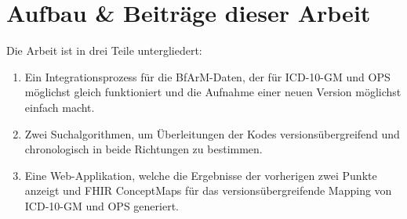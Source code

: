 \section{Aufbau \& Beiträge dieser Arbeit}

Die Arbeit ist in drei Teile untergliedert:

\begin{enumerate}
\item Ein Integrationsprozess für die BfArM-Daten, der für ICD-10-GM und OPS möglichst gleich funktioniert und die Aufnahme einer neuen Version möglichst einfach macht.
\item Zwei Suchalgorithmen, um Überleitungen der Kodes versionsübergreifend und chronologisch in beide Richtungen zu bestimmen. 
\item Eine Web-Applikation, welche die Ergebnisse der vorherigen zwei Punkte anzeigt und FHIR ConceptMaps für das versionsübergreifende Mapping von ICD-10-GM und OPS generiert. 
\end{enumerate}
